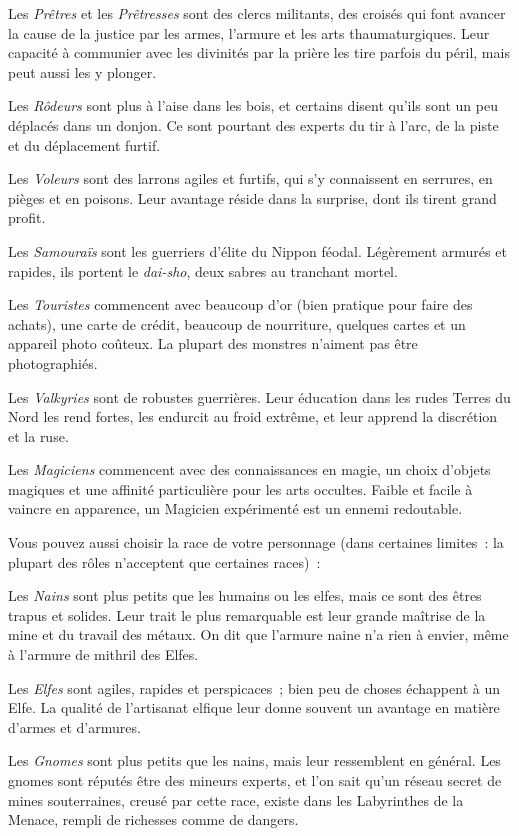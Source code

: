 \documentclass[titlepage]{article}
\begin{document}
Les \textit{Prêtres} et les \textit{Prêtresses} sont des clercs militants, des
croisés qui font avancer la cause de la justice par les armes, l'armure et
les arts thaumaturgiques.
Leur capacité à communier avec les divinités par la prière les tire
parfois du péril, mais peut aussi les y plonger.


Les \textit{Rôdeurs} sont plus à l'aise dans les bois, et certains disent
qu'ils sont un peu déplacés dans un donjon.
Ce sont pourtant des experts du tir à l'arc, de la piste et du déplacement
furtif.


Les \textit{Voleurs} sont des larrons agiles et furtifs, qui s'y connaissent
en serrures, en pièges et en poisons.
Leur avantage réside dans la surprise, dont ils tirent grand profit.


Les \textit{Samouraïs} sont les guerriers d'élite du Nippon féodal.
Légèrement armurés et rapides, ils portent le \textit{dai-sho}, deux sabres au
tranchant mortel.


Les \textit{Touristes} commencent avec beaucoup d'or (bien pratique pour
faire des achats), une carte de crédit, beaucoup de nourriture, quelques
cartes et un appareil photo coûteux.
La plupart des monstres n'aiment pas être photographiés.


Les \textit{Valkyries} sont de robustes guerrières.
Leur éducation dans les rudes Terres du Nord les rend fortes, les endurcit
au froid extrême, et leur apprend la discrétion et la ruse.


Les \textit{Magiciens} commencent avec des connaissances en magie, un choix
d'objets magiques et une affinité particulière pour les arts occultes.
Faible et facile à vaincre en apparence, un Magicien expérimenté est un
ennemi redoutable.


Vous pouvez aussi choisir la race de votre personnage (dans certaines
limites~: la plupart des rôles n'acceptent que certaines races)~:


Les \textit{Nains} sont plus petits que les humains ou les elfes, mais ce sont
des êtres trapus et solides.
Leur trait le plus remarquable est leur grande maîtrise de la mine et du
travail des métaux.
On dit que l'armure naine n'a rien à envier, même à l'armure de mithril des
Elfes.


Les \textit{Elfes} sont agiles, rapides et perspicaces~; bien peu de choses
échappent à un Elfe.
La qualité de l'artisanat elfique leur donne souvent un avantage en
matière d'armes et d'armures.


Les \textit{Gnomes} sont plus petits que les nains, mais leur ressemblent en
général.
Les gnomes sont réputés être des mineurs experts, et l'on sait qu'un
réseau secret de mines souterraines, creusé par cette race, existe dans les
Labyrinthes de la Menace, rempli de richesses comme de dangers.
\end{document}
